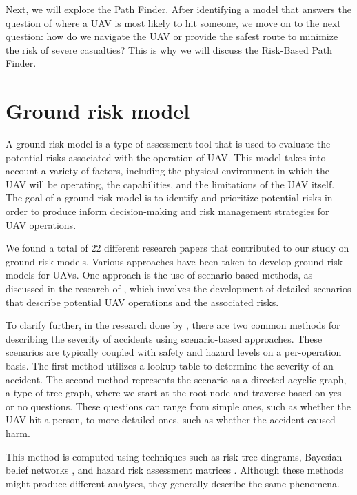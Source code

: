 \documentclass[12pt]{report}
\begin{document}
        Next, we will explore the Path Finder. After identifying a model that answers the question of where a UAV is
        most likely to hit someone, we move on to the next question: how do we navigate the UAV or provide the safest
        route to minimize the risk of severe casualties? This is why we will discuss the Risk-Based Path Finder.

    
    \section{Ground risk model}
        A ground risk model is a type of assessment tool that is used to evaluate the potential risks associated with
        the operation of UAV. This model takes into account a variety of factors, including the physical environment in
        which the UAV will be operating, the capabilities, and the limitations of the UAV itself. The goal of a ground
        risk model is to identify and prioritize potential risks in order to produce inform decision-making and risk
        management strategies for UAV operations.

        We found a total of 22 different research papers that contributed to our study on ground risk models. Various
        approaches have been taken to develop ground risk models for UAVs. One approach is the use of scenario-based
        methods, as discussed in the research of \cite{ancel_real-time_2017}, which involves the development of detailed
        scenarios that describe potential UAV operations and the associated risks.
            
        To clarify further, in the research done by \cite{ancel_real-time_2017}, there are two common methods for
        describing the severity of accidents using scenario-based approaches. These scenarios are typically coupled with
        safety and hazard levels on a per-operation basis. The first method utilizes a lookup table to determine the
        severity of an accident. The second method represents the scenario as a directed acyclic graph, a type of tree
        graph, where we start at the root node and traverse based on yes or no questions. These questions can range from
        simple ones, such as whether the UAV hit a person, to more detailed ones, such as whether the accident caused
        harm.
            
        \pagebreak
        This method is computed using techniques such as risk tree diagrams, Bayesian belief networks
        \cite{ancel_real-time_2017}, and hazard risk assessment matrices \cite{barr_preliminary_2017}. Although these
        methods might produce different analyses, they generally describe the same phenomena.
            
\end{document}
